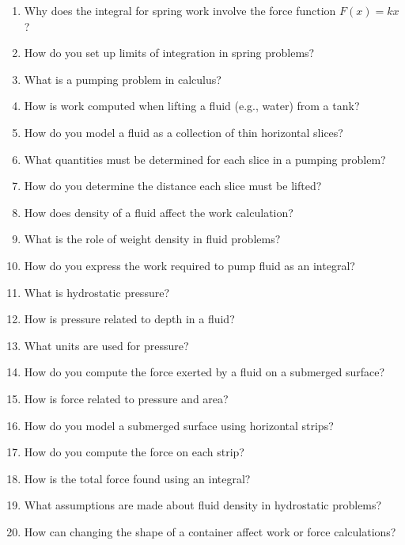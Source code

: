 \begin{enumerate}
\item Why does the integral for spring work involve the force function $F(x)=kx$?

\item How do you set up limits of integration in spring problems?

\item What is a pumping problem in calculus?

\item How is work computed when lifting a fluid (e.g., water) from a tank?

\item How do you model a fluid as a collection of thin horizontal slices?

\item What quantities must be determined for each slice in a pumping problem?

\item How do you determine the distance each slice must be lifted?

\item How does density of a fluid affect the work calculation?

\item What is the role of weight density in fluid problems?

\item How do you express the work required to pump fluid as an integral?

\item What is hydrostatic pressure?

\item How is pressure related to depth in a fluid?

\item What units are used for pressure?

\item How do you compute the force exerted by a fluid on a submerged surface?

\item How is force related to pressure and area?

\item How do you model a submerged surface using horizontal strips?

\item How do you compute the force on each strip?

\item How is the total force found using an integral?

\item What assumptions are made about fluid density in hydrostatic problems?

\item How can changing the shape of a container affect work or force calculations?

\end{enumerate}

